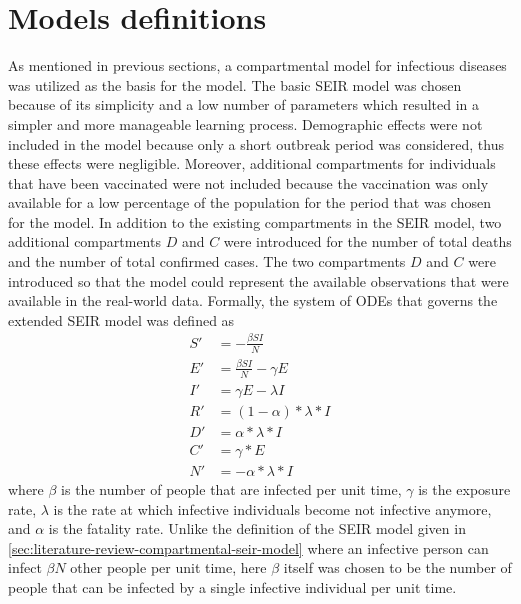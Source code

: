 \section{Models definitions}
\label{sec:methodologies-models-definitions}

As mentioned in previous sections, a compartmental model for infectious diseases was utilized as the basis for the model.
The basic \gls{SEIR} model was chosen because of its simplicity and a low number of parameters which resulted in a simpler and more manageable learning process.
Demographic effects were not included in the model because only a short outbreak period was considered, thus these effects were negligible.
Moreover, additional compartments for individuals that have been vaccinated were not included because the vaccination was only available for a low percentage of the population for the period that was chosen for the model.
In addition to the existing compartments in the \gls{SEIR} model, two additional compartments $D$ and $C$ were introduced for the number of total deaths and the number of total confirmed cases.
The two compartments $D$ and $C$ were introduced so that the model could represent the available observations that were available in the real-world data.
Formally, the system of \glspl{ODE} that governs the extended \gls{SEIR} model was defined as
\begin{equation}
    \begin{aligned}
        S' &= - \frac{\beta SI}{N} \\
        E' &= \frac{\beta SI}{N} - \gamma E \\
        I' &= \gamma E - \lambda I \\
        R' &= (1 - \alpha) * \lambda * I \\
        D' &= \alpha * \lambda * I \\
        C' &= \gamma * E \\
        N' &= - \alpha * \lambda * I
    \end{aligned}
    \label{eq:methodologies-seir-model}
\end{equation}
where $\beta$ is the number of people that are infected per unit time, $\gamma$ is the exposure rate, $\lambda$ is the rate at which infective individuals become not infective anymore, and $\alpha$ is the fatality rate.
Unlike the definition of the \gls{SEIR} model given in \autoref{sec:literature-review-compartmental-seir-model} where an infective person can infect $\beta N$ other people per unit time, here $\beta$ itself was chosen to be the number of people that can be infected by a single infective individual per unit time.
